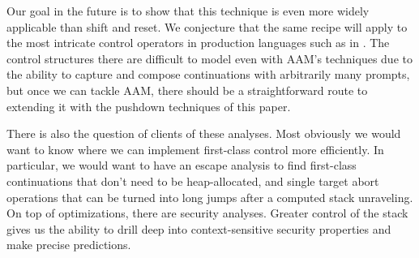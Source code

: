Our goal in the future is to show that this technique is even more widely applicable than shift and reset.
%
We conjecture that the same recipe will apply to the most intricate control operators in production languages such as in \citet{ianjohnson:Flatt:2007:ADC:1291151.1291178}.
%
The control structures there are difficult to model even with AAM's techniques due to the ability to capture and compose continuations with arbitrarily many prompts, but once we can tackle AAM, there should be a straightforward route to extending it with the pushdown techniques of this paper.

There is also the question of clients of these analyses.
%
Most obviously we would want to know where we can implement first-class control more efficiently.
%
In particular, we would want to have an escape analysis to find first-class continuations that don't need to be heap-allocated, and single target abort operations that can be turned into long jumps after a computed stack unraveling.
%
On top of optimizations, there are security analyses.
%
Greater control of the stack gives us the ability to drill deep into context-sensitive security properties and make precise predictions.
